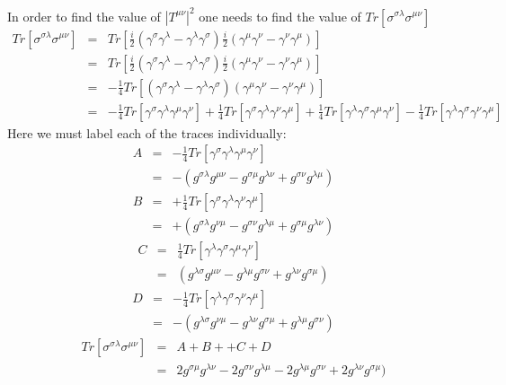 \documentclass[12pt]{article}
\def \bea{\begin{eqnarray}}
\def \eea{\end{eqnarray}}
\def \nn{\nonumber}
\def \nl{\nn \\}
\def \ga{\gamma}
\def \la{\lambda}
\def \si{\sigma}
\begin{document}
\begin{enumerate}
In order to find the value of $|T^{\mu\nu}|^2$ one needs to find the value of $Tr[\si^{\si\la}\si^{\mu\nu}]$\\
\bea
Tr[\si^{\si\la}\si^{\mu\nu}]&=& Tr[\frac{i}{2}(\ga^\si\ga^\la - \ga^\la\ga^\si)\frac{i}{2}(\ga^\mu\ga^\nu - \ga^\nu\ga^\mu)]\\
&=& Tr[\frac{i}{2}(\ga^\si\ga^\la - \ga^\la\ga^\si)\frac{i}{2}(\ga^\mu\ga^\nu - \ga^\nu\ga^\mu)]\nl
&=& -\frac{1}{4}Tr[(\ga^\si\ga^\la - \ga^\la\ga^\si)(\ga^\mu\ga^\nu - \ga^\nu\ga^\mu)]\nl
&=& -\frac{1}{4}Tr[\ga^\si\ga^\la\ga^\mu\ga^\nu]+\frac{1}{4}Tr[\ga^\si\ga^\la\ga^\nu\ga^\mu]+\frac{1}{4}Tr[\ga^\la\ga^\si\ga^\mu\ga^\nu]-\frac{1}{4}Tr [\ga^\la\ga^\si\ga^\nu\ga^\mu]\nn
\eea
Here we must label each of the traces individually: 
\bea
A &=&-\frac{1}{4}Tr[\ga^\si\ga^\la\ga^\mu\ga^\nu]\nl
&=&-(g^{\si\la}g^{\mu\nu}-g^{\si\mu}g^{\la\nu}+g^{\si\nu}g^{\la\mu})
\eea
\bea
B&=&+\frac{1}{4}Tr[\ga^\si\ga^\la\ga^\nu\ga^\mu]\nl
&=&+(g^{\si\la}g^{\nu\mu}-g^{\si\nu}g^{\la\mu}+g^{\si\mu}g^{\la\nu})
\eea
\bea
C&=& \frac{1}{4}Tr[\ga^\la\ga^\si\ga^\mu\ga^\nu]\nl
&=& (g^{\la\si}g^{\mu\nu}-g^{\la\mu}g^{\si\nu}+g^{\la\nu}g^{\si\mu})
\eea
\bea 
D&=& -\frac{1}{4}Tr [\ga^\la\ga^\si\ga^\nu\ga^\mu]\nl
&=& -(g^{\la\si}g^{\nu\mu}-g^{\la\nu}g^{\si\mu}+g^{\la\mu}g^{\si\nu})
\eea
\bea
Tr[\si^{\si\la}\si^{\mu\nu}]&=& A + B+ +C+D\nl
&=& 2g^{\si\mu}g^{\la\nu} - 2 g^{\si\nu}g^{\la\mu} - 2 g^{\la\mu}g^{\si\nu} +  2g^{\la\nu}g^{\si\mu})
\eea


\end{enumerate}
\end{document}
